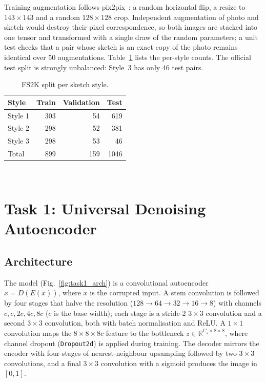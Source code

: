 \documentclass[conference]{IEEEtran}
\begin{document}
Training augmentation follows pix2pix~\cite{isola2017image}: a random
horizontal flip, a resize to $143\times143$ and a random $128\times128$
crop. Independent augmentation of photo and sketch would destroy their
pixel correspondence, so both images are stacked into one tensor and
transformed with a single draw of the random parameters; a unit test checks
that a pair whose sketch is an exact copy of the photo remains identical
over 50 augmentations. Table~\ref{tab:fs2k_split} lists the per-style
counts. The official test split is strongly unbalanced: Style~3 has only
46 test pairs.

\begin{table}[t]
\centering
\caption{FS2K split per sketch style.}
\label{tab:fs2k_split}
\footnotesize
\begin{tabular}{lrrr}
\toprule
Style & Train & Validation & Test \\
\midrule
Style 1 & 303 & 54 & 619 \\
Style 2 & 298 & 52 & 381 \\
Style 3 & 298 & 53 & 46 \\
\midrule
Total   & 899 & 159 & 1046 \\
\bottomrule
\end{tabular}
\\[3pt]
\end{table}

\section{Task 1: Universal Denoising Autoencoder}
\label{sec:task1}

\subsection{Architecture}
The model (Fig.~\ref{fig:task1_arch}) is a convolutional autoencoder
$\hat{x}=D(E(\tilde{x}))$, where $\tilde{x}$ is the corrupted input. A stem
convolution is followed by four stages that halve the resolution
($128\to64\to32\to16\to8$) with channels $c, c, 2c, 4c, 8c$ ($c$ is the
base width); each stage is a stride-2 $3\times3$ convolution and a second
$3\times3$ convolution, both with batch normalisation and ReLU. A $1\times1$
convolution maps the $8\times8\times8c$ feature to the bottleneck
$z\in\mathbb{R}^{C_z\times8\times8}$, where channel dropout
(\texttt{Dropout2d}) is applied during training. The decoder mirrors the
encoder with four stages of nearest-neighbour upsampling followed by two
$3\times3$ convolutions, and a final $3\times3$ convolution with a sigmoid
produces the image in $[0,1]$.
\end{document}
